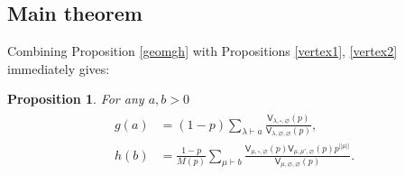 \documentclass{amsart}
\newtheorem{proposition}[theorem]{Proposition}
\theoremstyle{definition}
\newcommand{\sfV}{\mathsf{V}}
\begin{document}
\subsection{Main theorem}

Combining Proposition \ref{geomgh} with Propositions \ref{vertex1}, \ref{vertex2} immediately gives:
\begin{proposition} \label{combgh}
For any $a,b>0$ 
\begin{align}
\begin{split} \label{gh}
g(a) &= (1-p) \sum_{\lambda \vdash a} \frac{\sfV_{\lambda,\square,\varnothing}(p)}{\sfV_{\lambda,\varnothing,\varnothing}(p)}, \\
h(b) &= \frac{1-p}{M(p)} \sum_{\mu \vdash b} \frac{\sfV_{\mu,\square,\varnothing}(p) \sfV_{\mu,\mu',\varnothing}(p) p^{|\!|\mu|\!|}}{\sfV_{\mu,\varnothing,\varnothing}(p)}.
\end{split}
\end{align}
\end{proposition}
\end{document}

